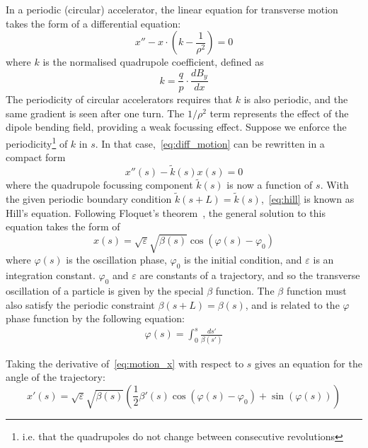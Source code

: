 \documentclass[a4paper,twoside,11pt]{report}
\begin{document}
In a periodic (circular) accelerator, the linear equation for transverse motion takes the form of a differential equation:
\begin{equation}
  x''-x\cdot\left(k-\frac{1}{\rho^2}\right)=0
  \label{eq:diff_motion}
\end{equation} 
where $k$ is the normalised quadrupole coefficient, defined as
\begin{equation}
  k=\frac{q}{p}\cdot\frac{dB_y}{dx}
  \label{eq:quadrupole}
\end{equation}
The periodicity of circular accelerators requires that $k$ is also periodic, and the same gradient is seen after one turn. The $1/\rho^2$ term represents the effect of the dipole bending field, providing a weak focussing effect. Suppose we enforce the periodicity\footnote{i.e. that the quadrupoles do not change between consecutive revolutions} of $k$ in $s$. In that case,~\autoref{eq:diff_motion} can be rewritten in a compact form
\begin{equation}
  x''(s)-\tilde{k}(s)x(s)=0
  \label{eq:hill}
\end{equation} where the quadrupole focussing component $\tilde{k}(s)$ is now a function of $s$. With the given periodic boundary condition $\tilde k(s+L)=\tilde{k}(s)$,~\ref{eq:hill} is known as Hill's equation. 
Following Floquet's theorem~\cite{Rossbach:247501}, the general solution to this equation takes the form of
\begin{equation}
x(s) =\sqrt{\varepsilon}\sqrt{\beta(s)}\cos(\varphi(s)-\varphi_0)
\label{eq:motion_x}
\end{equation} 
where $\varphi(s)$ is the oscillation phase, $\varphi_0$ is the initial condition, and $\varepsilon$ is an integration constant. $\varphi_0$ and $\varepsilon$ are constants of a trajectory, and so the transverse oscillation of a particle is given by the special $\beta$ function. The $\beta$ function must also satisfy the periodic constraint $\beta(s+L)=\beta(s)$, and is related to the $\varphi$ phase function by the following equation:
\begin{eqnarray}
  \varphi(s) = \int^s_0\frac{ds'}{\beta(s')}
  \label{eq:phase_and_beta}
\end{eqnarray}

Taking the derivative of~\eqref{eq:motion_x} with respect to $s$ gives an equation for the angle of the trajectory:
\begin{equation}
x'(s)=\sqrt{\varepsilon}\sqrt{\beta(s)}\left(\frac12\beta'(s)\cos(\varphi(s)-\varphi_0)+\sin(\varphi(s))\right)
\label{eq:motion_px}
\end{equation}
\end{document}
